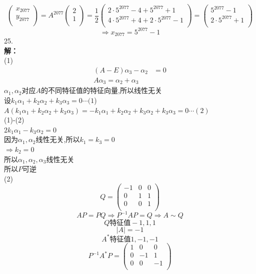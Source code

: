\documentclass[a4paper]{article}
\begin{document}
$$\begin{pmatrix}
    x_{2077}\\
    y_{2077}\\
\end{pmatrix}=A^{2077}\begin{pmatrix}
    2\\
    1\\
\end{pmatrix}=\frac{1}{2}\begin{pmatrix}
    2\cdot 5^{2077} -4+5^{2077}+1\\
    4\cdot 5^{2077}+4+2\cdot 5^{2077}-1\\
\end{pmatrix}=\begin{pmatrix}
    5^{2077} -1\\
    2\cdot 5^{2077}+1\\
\end{pmatrix}$$
$$\Rightarrow x_{2077}=5^{2077} -1$$
25.\\
\textbf{解：}\\
(1)\\
\begin{align*}
    (A-E)\alpha_3-\alpha_2&=0\\
    A\alpha_3=\alpha_2+\alpha_3
\end{align*}
$\alpha_1,\alpha_2$对应$A$的不同特征值的特征向量,所以线性无关\\
设$k_1 \alpha_1+k_2\alpha_2+k_3\alpha_3=0\cdots (1$)\\
$A(k_1 \alpha_1+k_2\alpha_2+k_3\alpha_3)=-k_1\alpha_1+k_2\alpha_2+k_3\alpha_2+k_3\alpha_3=0\cdots (2)$\\
(1)-(2)\\
$2k_1\alpha_1 -k_3\alpha_2=0$\\
因为$\alpha_1,\alpha_2$线性无关,所以$k_1=k_3=0$\\
$\Rightarrow k_2=0$\\
所以$\alpha_1,\alpha_2,\alpha_3$线性无关\\
所以$P$可逆\\
(2)\\
$$Q=\begin{pmatrix}
    -1&0&0\\
    0&1&1\\
    0&0&1\\
\end{pmatrix}$$
$$AP=PQ\Rightarrow P^{-1}AP=Q \Rightarrow A \sim Q$$
$$Q\text{特征值}-1,1,1$$
$$\left|A\right|=-1$$
$$A^{*}\text{特征值}1,-1,-1$$
$$P^{-1}A^{*}P=\begin{pmatrix}
    1&0&0\\
    0&-1&1\\
    0&0&-1\\
\end{pmatrix}$$
\end{document}
